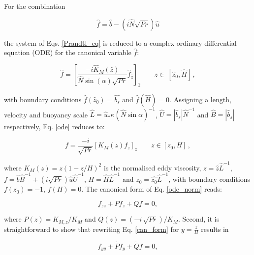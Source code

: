 For the combination
%
\begin{linenomath*}
\begin{equation}
   \hat{f}= \hat{b} - (i \hat{N} \sqrt{Pr}) \hat{u}
   \label{combinationVar}
\end{equation}
\end{linenomath*}
%
the system of Eqs. \ref{Prandtl_eq} is reduced to a complex ordinary differential equation (ODE) for the canonical variable $\hat{f}$:
%
\begin{linenomath*}
\label{ode_norm}
\begin{equation}
	\hat{f} = \left[ \frac{-i \hat{K}_M(\hat{z})}{\hat{N} \sin{(\alpha)} \sqrt{Pr}} \hat{f}_{\hat{z}} \right]_{\hat{z}} \qquad \hat{z} \in  \ [\hat{z}_0,\hat{H}] \, ,
	\label{ode}
\end{equation}
\end{linenomath*}
%
with boundary conditions $\hat{f}(\hat{z}_0)=\hat{b_s}$ and $\hat{f}(\hat{H}) = 0$.
Assigning a length, velocity and buoyancy scale $\hat{L}= \hat{u}_* \kappa (\hat{N} \sin{\alpha})^{-1}$, $\hat{U}=|\hat{b}_s| \hat{N}^{-1}$ and $\hat{B}=|\hat{b}_s|$ respectively, Eq. \ref{ode} reduces to:
%
\begin{linenomath*}
\begin{equation}
	f =  \frac{-i}{\sqrt{Pr}}\left[ K_M(z) f_z \right]_z \qquad  z \in [z_0,H] \, ,
	\label{ode_norm}
\end{equation}
\end{linenomath*}
%
where $K_M(z) = z(1-z/H)^2$ is the normalised eddy viscosity, $z=\hat{z}\hat{L}^{-1}$, $f = \hat{b} \hat{B}^{-1} + (i\sqrt{Pr})\hat{u}\hat{U}^{-1}$, $H=\hat{H}\hat{L}^{-1}$ and $z_0=\hat{z_0}\hat{L}^{-1}$, with boundary conditions $f(z_0)=-1$, $f(H) = 0$.
%
The canonical form of Eq. \ref{ode_norm} reads:
%
\begin{linenomath*}
\begin{equation}
	\label{can_form}
	f_{zz}+P f_z+ Qf =0,
\end{equation}
\end{linenomath*}
%
where $P(z)=K_{M,z} / K_M$ and $Q(z)= (-i \, \sqrt{Pr}) /K_M$. Second, it is straightforward to show that rewriting Eq. \ref{can_form} for $y= \frac{z }{H}
$ results in
%
\begin{linenomath*}
\begin{equation}
	\label{can_form_sec}
	f_{yy}+\widetilde{P} f_y+ \widetilde{Q} f =0,
\end{equation}
\end{linenomath*}
